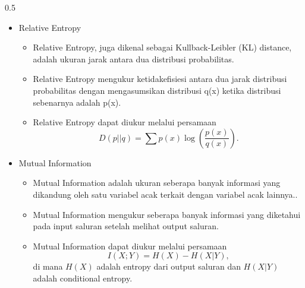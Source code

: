 \begin{frame}
\begin{columns}[T]
   \begin{column}{0.5\textwidth}
        \begin{itemize}
            \item Relative Entropy \cite{wolfowitz2012coding}\\
                \begin{itemize}
                \tiny \justifying                
                    \item[$\Rightarrow$] Relative Entropy, juga dikenal sebagai Kullback-Leibler (KL) distance, adalah ukuran jarak antara dua distribusi probabilitas.
                    \item[$\Rightarrow$]   Relative Entropy mengukur ketidakefisiesi antara dua jarak distribusi probabilitas dengan mengasumsikan distribusi q(x) ketika distribusi sebenarnya adalah p(x). 
                    \item[$\Rightarrow$] Relative Entropy dapat diukur melalui persamaan 
                        \begin{equation}
                            D(p||q) = \sum p(x) \log\left(\frac{p(x)}{q(x)}\right).
                        \end{equation}
                \end{itemize}
            \item Mutual Information \cite{djordjevic2019physical}\\
                \begin{itemize}
                \tiny \justifying
                    \item[$\Rightarrow$] Mutual Information adalah ukuran seberapa banyak informasi yang dikandung oleh satu variabel acak terkait dengan variabel acak lainnya..
                    \item[$\Rightarrow$]  Mutual Information mengukur seberapa banyak informasi yang diketahui pada input saluran setelah melihat output saluran.
                    \item[$\Rightarrow$]Mutual Information dapat diukur melalui persamaan
                        \begin{equation}
                           I(X;Y) = H(X) - H(X|Y),
                        \end{equation}
                     di mana $H(X)$ adalah entropy dari output saluran dan $H(X|Y)$ adalah conditional entropy.
                \end{itemize}
        \end{itemize}
    \end{column}
  \end{columns}   
\end{frame}


